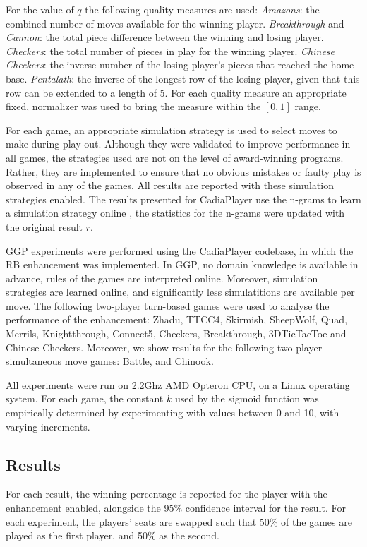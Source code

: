 \documentclass{ecai2014}
\begin{document}
For the value of $q$ the following quality measures are used: \emph{Amazons}: the combined number of moves available for the winning player. \emph{Breakthrough} and \emph{Cannon}: the total piece difference between the winning and losing player. \emph{Checkers}: the total number of pieces in play for the winning player. \emph{Chinese Checkers}: the inverse number of the losing player's pieces that reached the home-base. \emph{Pentalath}: the inverse of the longest row of the losing player, given that this row can be extended to a length of 5.
For each quality measure an appropriate fixed, normalizer was used to bring the measure within the $[0,1]$ range.

For each game, an appropriate simulation strategy is used to select moves to make during play-out. Although they were validated to improve performance in all games, the strategies used are not on the level of award-winning programs. Rather, they are implemented to ensure that no obvious mistakes or faulty play is observed in any of the games. All results are reported with these simulation strategies enabled. The results presented for {\sc CadiaPlayer} use the n-grams to learn a simulation strategy online \cite{takngrams}, the statistics for the n-grams were updated with the original result $r$.

GGP experiments were performed using the {\sc CadiaPlayer} codebase, in which the RB enhancement was implemented. In GGP, no domain knowledge is available in advance, rules of the games are interpreted online. Moreover, simulation strategies are learned online, and significantly less simulatitions are available per move. The following two-player turn-based games were used to analyse the performance of the enhancement: Zhadu, TTCC4, Skirmish, SheepWolf, Quad, Merrils, Knightthrough, Connect5, Checkers, Breakthrough, 3DTicTacToe and Chinese Checkers. Moreover, we show results for the following two-player simultaneous move games: Battle, and Chinook.

All experiments were run on 2.2Ghz AMD Opteron CPU, on a Linux operating system. For each game, the constant $k$ used by the sigmoid function was empirically determined by experimenting with values between 0 and 10, with varying increments.
\subsection{Results}
\label{subsec:results}
For each result, the winning percentage is reported for the player with the enhancement enabled, alongside the 95\% confidence interval for the result. For each experiment, the players' seats are swapped such that 50\% of the games are played as the first player, and 50\% as the second.
\end{document}
